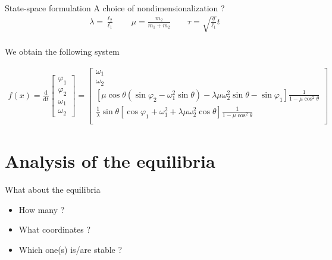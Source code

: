 \documentclass{beamer}
\begin{document}
\begin{frame}{State-space formulation}
A choice of nondimensionalization ?
\pause
\begin{align*}
    \lambda = \frac{\ell_2}{\ell_1} \qquad \mu  = \frac{m_2}{m_1+m_2} \qquad \tau = \sqrt{\frac{g}{\ell_1}} t\\
\end{align*} \pause

We obtain the following system
\begin{small}
\begin{align*}
    f(x)=
    \frac{\mathrm{d}}{\mathrm{d}t}
    \begin{bmatrix}
        \varphi_1\\[2pt]
        \varphi_2\\[2pt]
        \omega_1\\[2pt]
        \omega_2
    \end{bmatrix} = 
    \begin{bmatrix}
        \omega_1\\[2pt]
        \omega_2\\[2pt]
        \left[\mu \cos \theta (\sin \varphi_2 - \omega_1^2 \sin \theta) - \lambda \mu \omega_2^2 \sin \theta - \sin \varphi_1\right]\frac{1}{1 - \mu \cos^2\theta}\\[2pt]
        \frac{1}{\lambda} \sin \theta \left[\cos \varphi_1 + \omega_1^2 + \lambda \mu \omega_2^2 \cos \theta \right]\frac{1}{1 - \mu \cos^2\theta}\\[2pt]
    \end{bmatrix}
\end{align*}
\end{small}

\end{frame}


\section{Analysis of the equilibria}

\begin{frame}{What about the equilibria}
\begin{itemize}
    \setlength\itemsep{\fill}
    \item How many ?
    \item What coordinates ?
    \item Which one(s) is/are stable ?
\end{itemize}    
\end{frame}
\end{document}
